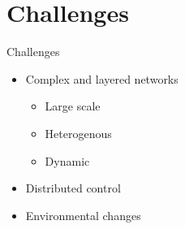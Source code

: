 \documentclass[aspectratio=169]{beamer}
\begin{document}
\section{Challenges}
\begin{frame}{Challenges}
  \begin{card}
    \begin{itemize}
      \item<1-| alert@1> Complex and layered networks
      \begin{itemize}
        \item <2-| alert@2>Large scale
        \item <3-| alert@3>Heterogenous
        \item <4-| alert@4>Dynamic
      \end{itemize}
      \item<5-| alert@5> Distributed control
      \item<6-| alert@6> Environmental changes
    \end{itemize}
  \end{card}
\end{frame}
\end{document}
